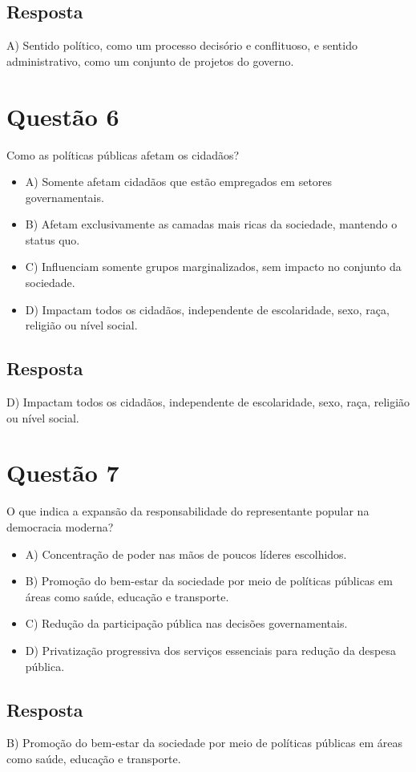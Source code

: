 \documentclass[
   article,       
   12pt,          
   oneside,       
   a4paper,       
   english,       
   brazil,        
   sumario=tradicional
   ]{abntex2}
\begin{document}
\subsection{Resposta}
A) Sentido político, como um processo decisório e conflituoso, e sentido administrativo, como um conjunto de projetos do governo.

\section{Questão 6}
Como as políticas públicas afetam os cidadãos?
\begin{itemize}
    \item {A) Somente afetam cidadãos que estão empregados em setores governamentais.}
    \item {B) Afetam exclusivamente as camadas mais ricas da sociedade, mantendo o status quo.}
    \item {C) Influenciam somente grupos marginalizados, sem impacto no conjunto da sociedade.}
    \item {D) Impactam todos os cidadãos, independente de escolaridade, sexo, raça, religião ou nível social.}
\end{itemize}

\subsection{Resposta}
D) Impactam todos os cidadãos, independente de escolaridade, sexo, raça, religião ou nível social.

\section{Questão 7}
O que indica a expansão da responsabilidade do representante popular na democracia moderna?
\begin{itemize}
    \item {A) Concentração de poder nas mãos de poucos líderes escolhidos.}
    \item {B) Promoção do bem-estar da sociedade por meio de políticas públicas em áreas como saúde, educação e transporte.}
    \item {C) Redução da participação pública nas decisões governamentais.}
    \item {D) Privatização progressiva dos serviços essenciais para redução da despesa pública.}
\end{itemize}

\subsection{Resposta}
B) Promoção do bem-estar da sociedade por meio de políticas públicas em áreas como saúde, educação e transporte.
\end{document}
